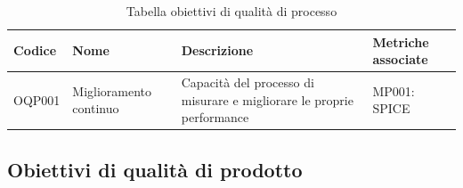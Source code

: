 \documentclass[openany,12pt,a4paper]{report}
\begin{document}
    	\begin{longtable}{| p{2cm} | p{3.5cm} |p{5.5cm} | p{5.5cm} |}
    		\caption {Tabella obiettivi di qualità di processo} \label{tab:title} \\
    		\hline
    		\textbf{Codice} & \textbf{Nome} & \textbf{Descrizione} & \textbf{Metriche associate}\\
    		\hline
    		\endhead
    		
    		\newline OQP001&
    		\newline Miglioramento continuo&
    		\newline Capacità del processo di misurare e migliorare le proprie performance \newline &
    		\newline MP001: SPICE
    		\\[1em]
    		
    		\hline
    	\end{longtable}
    
    \subsection{Obiettivi di qualità di prodotto}
        
\end{document}
